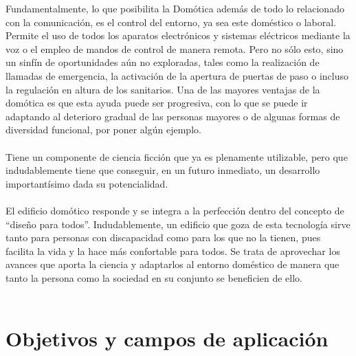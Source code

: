 Fundamentalmente, lo que posibilita la Domótica además de todo lo relacionado con la comunicación, es el control del entorno, ya sea este doméstico o laboral. Permite el uso de todos los aparatos electrónicos y sistemas eléctricos mediante la voz o el empleo de mandos de control de manera remota. Pero no sólo esto, sino un sinfín de oportunidades aún no exploradas, tales como la realización de llamadas de emergencia, la activación de la apertura de puertas de paso o incluso la regulación en altura de los sanitarios. Una de las mayores ventajas de la domótica es que esta ayuda puede ser progresiva, con lo que se puede ir adaptando al deterioro gradual de las personas mayores o de algunas formas de diversidad funcional, por poner algún ejemplo. \\\\
Tiene un componente de ciencia ficción que ya es plenamente utilizable, pero que indudablemente tiene que conseguir, en un futuro inmediato, un desarrollo importantísimo dada su potencialidad. \\\\
El edificio domótico responde y se integra a la perfección dentro del concepto de “diseño para todos”. Indudablemente, un edificio que goza de esta tecnología sirve tanto para personas con discapacidad como para los que no la tienen, pues facilita la vida y la hace más confortable para todos. Se trata de aprovechar los avances que aporta la ciencia y adaptarlos al entorno doméstico de manera que tanto la persona como la sociedad en su conjunto se beneficien de ello. \\\\


\section{Objetivos y campos de aplicación}

